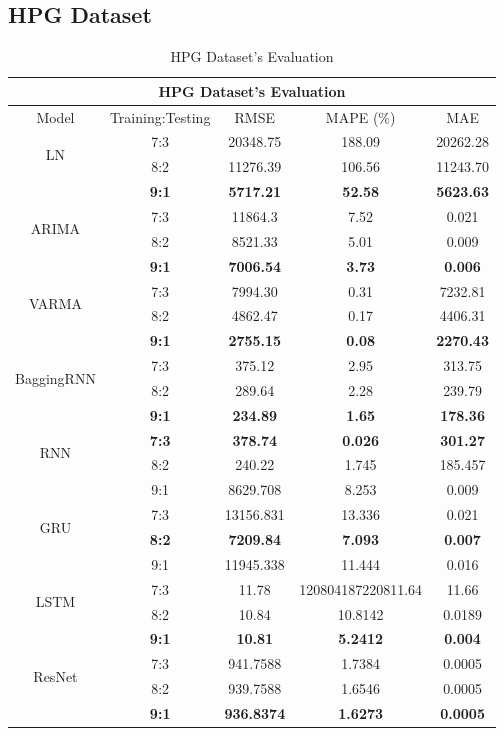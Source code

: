 \documentclass{ieeeojies}
\begin{document}
\subsection{HPG Dataset} 
\begin{table}[H]
    \centering
    \begin{tabular}{|c|c|c|c|c|}
         \hline
         \multicolumn{5}{|c|}{\textbf{HPG Dataset's Evaluation}}\\
         \hline
         \centering Model & Training:Testing & RMSE & MAPE (\%) & MAE\\
         \hline
         \multirow{2}{*}{LN} & 7:3 & 20348.75 & 188.09 & 20262.28 \\ & 8:2 & 11276.39 & 106.56 & 11243.70 \\ & \textbf{9:1} & \textbf{5717.21} & \textbf{52.58} & \textbf{5623.63}\\
         \hline
         \multirow{2}{*}{ARIMA} & 7:3&11864.3&7.52&0.021\\ & 8:2&8521.33&5.01&0.009 \\ & \textbf{9:1} & \textbf{7006.54} & \textbf{3.73} & \textbf{0.006}\\
         \hline
         \multirow{2}{*}{VARMA} & 7:3	& 7994.30 & 0.31 & 7232.81 \\ & 8:2 & 4862.47 & 0.17 & 4406.31 \\ & \textbf{9:1} & \textbf{2755.15}  & \textbf{0.08} & \textbf{2270.43}\\
         \hline
         \multirow{2}{*}{BaggingRNN} & 7:3 &  375.12 &  2.95 & 313.75 \\ & 8:2 &  289.64 & 2.28 & 239.79 \\ & \textbf{9:1} & \textbf{234.89}  & \textbf{1.65} & \textbf{178.36}\\
         \hline
         \multirow{2}{*}{RNN} & \textbf{7:3}	& \textbf{378.74} & \textbf{0.026} & \textbf{301.27} \\ & 8:2 & 240.22 & 1.745 & 185.457 \\ & 9:1 & 8629.708 & 8.253 & 0.009\\
         \hline
         \multirow{2}{*}{GRU} & 7:3 & 13156.831&13.336 & 0.021 \\ & \textbf{8:2} &	\textbf{7209.84} & \textbf{7.093} & \textbf{0.007} \\ & 9:1 &11945.338	&11.444&0.016\\
         \hline
         \multirow{2}{*}{LSTM} & 7:3 & 11.78 & 120804187220811.64 & 11.66 \\ & 8:2 & 10.84 &10.8142 & 0.0189 \\ & \textbf{9:1} &  	\textbf{10.81} &	\textbf{5.2412} & 	\textbf{0.004} \\
         \hline
         \multirow{2}{*}{ResNet} & 7:3 & 941.7588 &  1.7384 &  0.0005 \\ & 8:2 & 939.7588 &  1.6546 &  0.0005 \\ & \textbf{9:1} & \textbf{936.8374} & \textbf{1.6273} & \textbf{0.0005}\\
         \hline
    \end{tabular}
    \caption{HPG Dataset's Evaluation}
    \label{vcbresult}
\end{table}
\end{document}
